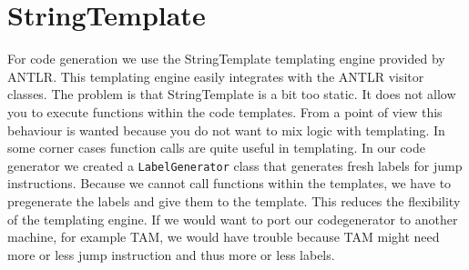 \section{StringTemplate}
For code generation we use the StringTemplate templating engine provided by ANTLR. This templating engine easily integrates with the ANTLR visitor classes. The problem is that StringTemplate is a bit too static. It does not allow you to execute functions within the code templates. From a point of view this behaviour is wanted because you do not want to mix logic with templating. In some corner cases function calls are quite useful in templating. In our code generator we created a \texttt{LabelGenerator} class that generates fresh labels for jump instructions. Because we cannot call functions within the templates, we have to pregenerate the labels and give them to the template. This reduces the flexibility of the templating engine. If we would want to port our codegenerator to another machine, for example TAM, we would have trouble because TAM might need more or less jump instruction and thus more or less labels.